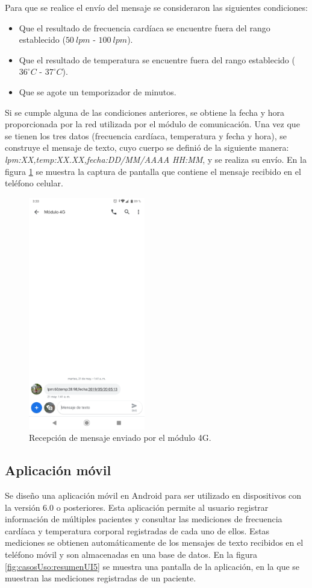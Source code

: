 \documentclass[journal]{IEEEtran}
\begin{document}
Para que se realice el envío del mensaje se consideraron las siguientes condiciones:
\begin{itemize}
	\item Que el resultado de frecuencia cardíaca se encuentre fuera del rango establecido ($50\ lpm$ - $100\ lpm$).
	\item Que el resultado de temperatura se encuentre fuera del rango establecido ($36^{\circ}C$ - $37^{\circ}C$).
	\item Que se agote un temporizador de minutos.
\end{itemize}

Si se cumple alguna de las condiciones anteriores, se obtiene la fecha y hora proporcionada por la red utilizada por el módulo de comunicación. Una vez que se tienen los tres datos (frecuencia cardíaca, temperatura y fecha y hora), se construye el mensaje de texto, cuyo cuerpo se definió de la siguiente manera: \textit{lpm:XX,temp:XX.XX,fecha:DD/MM/AAAA HH:MM}, y se realiza su envío. En la figura \ref{fig:RecepcionMsj} se muestra la captura de pantalla que contiene el mensaje recibido en el teléfono celular.

\begin{figure}[htbp!]
	\centering
	\includegraphics[width=2in]{AvancesPruebas/imagenes/formatoSMS.png}
	\caption{Recepción de mensaje enviado por el módulo 4G.}
	\label{fig:RecepcionMsj}
\end{figure}

\subsection{Aplicación móvil}
Se diseño una aplicación móvil en Android para ser utilizado en dispositivos con la versión 6.0 o posteriores. Esta aplicación permite al usuario registrar información de múltiples pacientes y consultar las mediciones de frecuencia cardíaca y temperatura corporal registradas de cada uno de ellos. Estas mediciones se obtienen automáticamente de los mensajes de texto recibidos en el teléfono móvil y son almacenadas en una base de datos. En la figura \ref{fig:casosUso:resumenUI5} se muestra una pantalla de la aplicación, en la que se muestran las mediciones registradas de un paciente.
\end{document}
